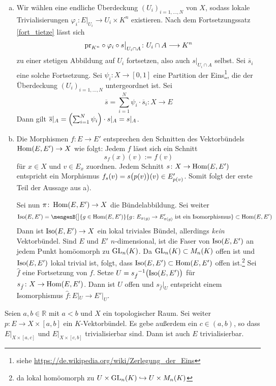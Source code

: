 \begin{beweis}
\leavevmode
\begin{enumerate}[a)]
	\item Wir wählen eine endliche Überdeckung $(U_i)_{i=1,\ldots ,N}$ von $X$, sodass lokale Trivialisierungen $\varphi_i\colon E|_{U_i}\to U_i\times K^n$ existieren. Nach 
	dem Fortsetzungssatz \ref{fort_tietze} lässt sich 
	\[
		\pr_{K^n} \circ \varphi_i \circ s\big|_{U_i \cap A} \colon U_i \cap A \longrightarrow K^n 
	\]
	zu einer stetigen Abbildung auf $U_i$ fortsetzen, also auch $s|_{U_i \cap A}$ selbst. Sei $\overline{s}_i$ eine solche Fortsetzung. Sei $\psi_i \colon X \to [0,1]$ eine 
	Partition der Eins\footnote{siehe \url{https://de.wikipedia.org/wiki/Zerlegung_der_Eins}}, die der Überdeckung $(U_i)_{i=1,\ldots ,N}$ 
	untergeordnet ist. Sei
	\[
		\overline{s} = \sum_{i=1}^{N} \psi_i \cdot \overline{s}_i \colon X \longrightarrow E 
	\]
	Dann gilt $\overline{s}|_A = \enbrace*{\sum_{i=1}^{N} \psi_i} \cdot s|_A= s|_A$.
	\item Die Morphismen $f \colon E \to E'$ entsprechen den Schnitten des Vektorbündels $\Hom(E,E') \to X$ wie folgt: Jedem $f$ lässt sich ein Schnitt
	\[
		s_f(x)(v) := f(v)
	\]
	für $x \in X$ und $v \in E_x$ zuordnen. Jedem Schnitt $s \colon X \to \Hom(E,E')$ entspricht ein Morphismus $f_s(v)=s \enbrace[\big]{p(v)}(v) \in E'_{p(v)}$. Somit 
	folgt der erste Teil der Aussage aus a).
	
	Sei nun $\pi \colon \Hom(E,E') \to X$ die Bündelabbildung. Sei weiter
	\[
		\Iso(E,E') = \mengenB[\big]{g \in \Hom(E,E')}{g \colon E_{\pi(g)} \to E'_{\pi(g)} \text{ ist ein Isomorphismus}} \subset \Hom(E,E')
	\]
	Dann ist $\Iso(E,E') \to X$ ein lokal triviales Bündel, allerdings \emph{kein} Vektorbündel. Sind $E$ und $E'$ $n$-dimensional, ist die Faser von $\Iso(E,E')$ an jedem 
	Punkt homöomorph zu $\GL_n(K)$. Da $\GL_n(K) \subset M_n(K)$ offen ist und $\Iso(E,E')$ lokal trivial ist, folgt, dass $\Iso(E,E') \subset \Hom(E,E')$ offen 
	ist.\footnote{da lokal homöomorph zu $U \times \GL_n(K) \hookrightarrow U \times M_n(K)$} Sei $\hat{f}$ eine Fortsetzung von $f$. Setze 
	$U = {s_{\hat{f}}}\mkern-0.5mu^{-1} \enbrace[\big]{\Iso(E,E')}$ für $s_{\hat{f}} \colon X \to \Hom(E,E')$. Dann ist $U$ offen und $s_{\hat{f}}|_U$ entspricht einem 
	Isomorphismus $\hat{f} \colon E|_U \to E'|_U$. \qedhere
\end{enumerate}	
\end{beweis}


\begin{lemma}
Seien $a,b \in \mathds{R}$ mit $a <b$ und $X$ ein topologischer Raum. Sei weiter $p \colon E \to X \times [a,b]$ ein $K$-Vektorbündel. Es gebe außerdem ein $c \in (a,b)$, 
so dass $E|_{X \times [a,c]}$ und $E|_{X \times [c,b]}$ trivialisierbar sind. Dann ist auch $E$ trivialisierbar.	
\end{lemma}

